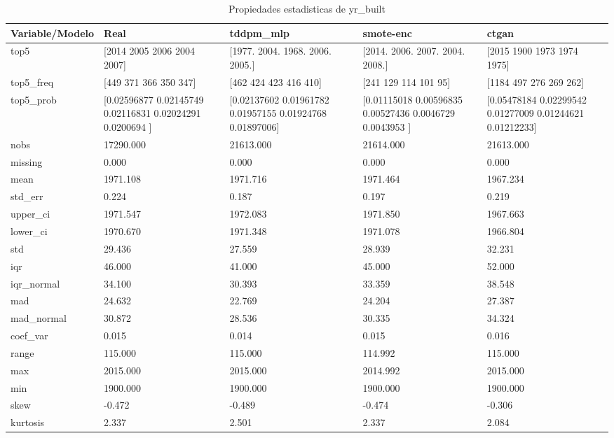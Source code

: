 \begin{table}[H]
\centering
\caption{Propiedades  estadisticas de yr_built}
\label{table-stats-yr_built}
\begin{tabular}{|l|m{10em}|m{10em}|m{10em}|m{10em}|}
\hline
 \rowcolor[gray]{0.8}
Variable/Modelo & Real & tddpm\_mlp & smote-enc & ctgan \\
\hline top5 & [2014 2005 2006 2004 2007] & [1977. 2004. 1968. 2006. 2005.] & [2014. 2006. 2007. 2004. 2008.] & [2015 1900 1973 1974 1975] \\
\hline top5\_freq & [449 371 366 350 347] & [462 424 423 416 410] & [241 129 114 101  95] & [1184  497  276  269  262] \\
\hline top5\_prob & [0.02596877 0.02145749 0.02116831 0.02024291 0.0200694 ] & [0.02137602 0.01961782 0.01957155 0.01924768 0.01897006] & [0.01115018 0.00596835 0.00527436 0.0046729  0.0043953 ] & [0.05478184 0.02299542 0.01277009 0.01244621 0.01212233] \\
\hline nobs & 17290.000 & 21613.000 & 21614.000 & 21613.000 \\
\hline missing & 0.000 & 0.000 & 0.000 & 0.000 \\
\hline mean & 1971.108 & 1971.716 & 1971.464 & 1967.234 \\
\hline std\_err & 0.224 & 0.187 & 0.197 & 0.219 \\
\hline upper\_ci & 1971.547 & 1972.083 & 1971.850 & 1967.663 \\
\hline lower\_ci & 1970.670 & 1971.348 & 1971.078 & 1966.804 \\
\hline std & 29.436 & 27.559 & 28.939 & 32.231 \\
\hline iqr & 46.000 & 41.000 & 45.000 & 52.000 \\
\hline iqr\_normal & 34.100 & 30.393 & 33.359 & 38.548 \\
\hline mad & 24.632 & 22.769 & 24.204 & 27.387 \\
\hline mad\_normal & 30.872 & 28.536 & 30.335 & 34.324 \\
\hline coef\_var & 0.015 & 0.014 & 0.015 & 0.016 \\
\hline range & 115.000 & 115.000 & 114.992 & 115.000 \\
\hline max & 2015.000 & 2015.000 & 2014.992 & 2015.000 \\
\hline min & 1900.000 & 1900.000 & 1900.000 & 1900.000 \\
\hline skew & -0.472 & -0.489 & -0.474 & -0.306 \\
\hline kurtosis & 2.337 & 2.501 & 2.337 & 2.084 \\

\end{tabular}
\end{table}
